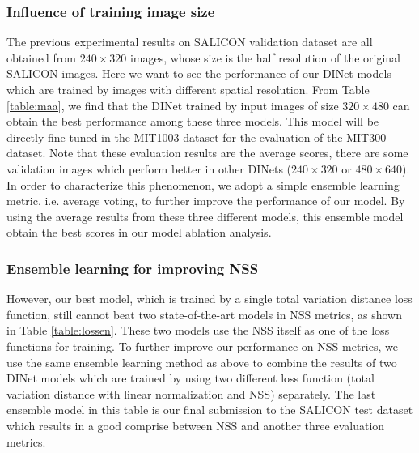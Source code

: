 \subsubsection{Influence of training image size} 
The previous experimental results on SALICON validation dataset are all obtained from $240 \times 320$ images, whose size is the half resolution of the original SALICON images. Here we want to see the performance of our DINet models which are trained by images with different spatial resolution. From Table \ref{table:maa}, we find that the DINet trained by input images of size $320 \times 480$ can obtain the best performance among these three models. This model will be directly fine-tuned in the MIT1003 dataset for the evaluation of the MIT300 dataset. Note that these evaluation results are the average scores, there are some validation images which perform better in other DINets ($240 \times 320$ or $480 \times 640$). In order to characterize this phenomenon, we adopt a simple ensemble learning metric, i.e. average voting, to further improve the performance of our model. By using the average results from these three different models, this ensemble model obtain the best scores in our model ablation analysis.

\subsubsection{Ensemble learning for improving NSS} 
However, our best model, which is trained by a single total variation distance loss function, still cannot beat two state-of-the-art models \cite{cornia2016predicting,liu2016deep} in NSS metrics, as shown in Table \ref{table:lossen}. These two models use the NSS itself as one of the loss functions for training. To further improve our performance on NSS metrics, we use the same ensemble learning method as above to combine the results of two DINet models which are trained by using two different loss function (total variation distance with linear normalization and NSS) separately. The last ensemble model in this table is our final submission to the SALICON test dataset which results in a good comprise between NSS and another three evaluation metrics.





